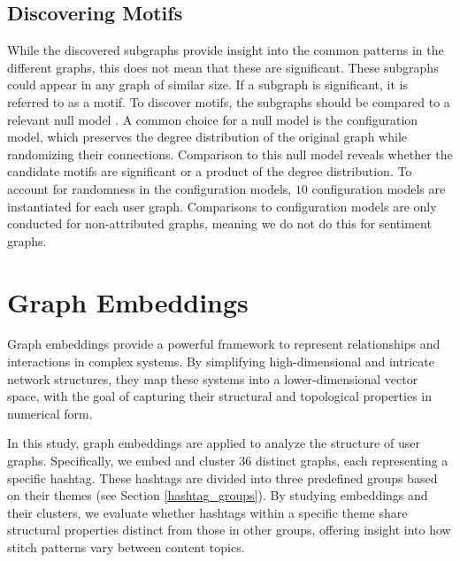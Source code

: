 \subsection{Discovering Motifs}\label{nullmodel_intro}
While the discovered subgraphs provide insight into the common patterns in the different graphs, this does not mean that these are significant. These subgraphs could appear in any graph of similar size. If a subgraph is significant, it is referred to as a motif. To discover motifs, the subgraphs should be compared to a relevant null model \citep{coscia2021atlasaspiringnetworkscientist}. A common choice for a null model is the configuration model, which preserves the degree distribution of the original graph while randomizing their connections. Comparison to this null model reveals whether the candidate motifs are significant or a product of the degree distribution. To account for randomness in the configuration models, $10$ configuration models are instantiated for each user graph. Comparisons to configuration models are only conducted for non-attributed graphs, meaning we do not do this for sentiment graphs. 



\section{Graph Embeddings}
Graph embeddings provide a powerful framework to represent relationships and interactions in complex systems. By simplifying high-dimensional and intricate network structures, they map these systems into a lower-dimensional vector space, with the goal of capturing their structural and topological properties in numerical form.

In this study, graph embeddings are applied to analyze the structure of user graphs. Specifically, we embed and cluster $36$ distinct graphs, each representing a specific hashtag. These hashtags are divided into three predefined groups based on their themes (see Section \ref{hashtag_groups}). By studying embeddings and their clusters, we evaluate whether hashtags within a specific theme share structural properties distinct from those in other groups, offering insight into how stitch patterns vary between content topics.

